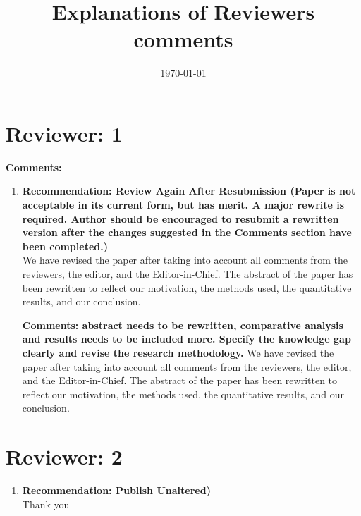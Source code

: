 \documentclass[11pt]{article}
\title{Explanations of Reviewers comments}
\date{\today}
\begin{document}
\maketitle
\section*{Reviewer: 1}


\textbf{Comments:}


\begin{enumerate}
\item\textbf{
Recommendation: Review Again After Resubmission (Paper is not acceptable in its current form, but has merit. A major rewrite is required. Author should be encouraged to resubmit a rewritten version after the changes suggested in the Comments section have been completed.)}\\
We have revised the paper after taking into account all comments from the reviewers, the editor, and the Editor-in-Chief. The abstract of the paper has been rewritten to reflect our motivation, the methods used, the quantitative results, and our conclusion.

\textbf{Comments:
abstract needs to be rewritten, comparative analysis and results needs to be included more. Specify the knowledge gap clearly and revise the research methodology.
}
 We have revised the paper after taking into account all comments from the reviewers, the editor, and the Editor-in-Chief. The abstract of the paper has been rewritten to reflect our motivation, the methods used, the quantitative results, and our conclusion.
\end{enumerate}

\section*{Reviewer: 2}
\begin{enumerate}
	\item \textbf{Recommendation: Publish Unaltered)
}\\
Thank you

\end{enumerate}
\end{document}
